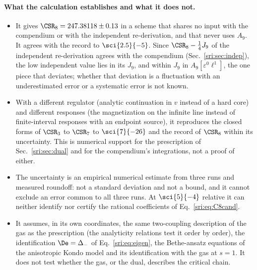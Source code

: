 \paragraph{What the calculation establishes and what it does not.}
\begin{itemize}
\item It gives $\CSR_8=247.38118\pm0.13$ in a scheme that shares no input with the compendium or with the independent
 re-derivation, and that never uses $A_9$. It agrees with the record to $\sci{2.5}{-5}$. Since $\CSR_8-\frac14J_9$ of
 the independent re-derivation agrees with the compendium (Sec.~\ref{sri:sec:indep}), the low independent value lies in its
 $J_9$, and within $J_9$ in $A_9[\varepsilon^0\ell^1]$, the one piece that deviates; whether that deviation is a
 fluctuation with an underestimated error or a systematic error is not known.
\item With a different regulator (analytic continuation in $v$ instead of a hard core) and different responses (the
 magnetization on the infinite line instead of finite-interval responses with an endpoint source), it reproduces the
 closed forms of $\CSR_3$ to $\CSR_7$ to $\sci{7}{-26}$ and the record of $\CSR_8$ within its uncertainty. This is
 numerical support for the prescription of Sec.~\ref{sri:sec:dual} and for the compendium's integrations, not a proof of
 either.
\item The uncertainty is an empirical numerical estimate from three runs and measured roundoff: not a standard
 deviation and not a bound, and it cannot exclude an error common to all three runs. At $\sci{5}{-4}$ relative it can
 neither identify nor certify the rational coefficients of Eq.~\eqref{sri:eq:C8cand}.
\item It assumes, in its own coordinates, the same two-coupling description of the gas as the prescription (the
 analyticity relations test it order by order), the identification $\De=\Delta_-$ of Eq.~\eqref{sri:eq:eigen}, the
 Bethe-ansatz equations of the anisotropic Kondo model and its identification with the gas at $s=1$. It does not test
 whether the gas, or the dual, describes the critical chain.
\end{itemize}

